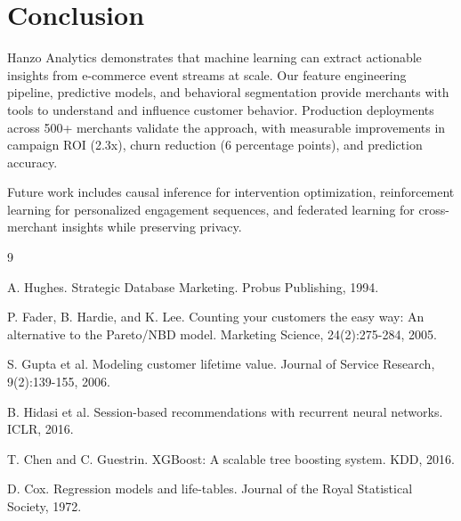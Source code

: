 \section{Conclusion}


Hanzo Analytics demonstrates that machine learning can extract actionable insights from e-commerce event streams at scale. Our feature engineering pipeline, predictive models, and behavioral segmentation provide merchants with tools to understand and influence customer behavior. Production deployments across 500+ merchants validate the approach, with measurable improvements in campaign ROI (2.3x), churn reduction (6 percentage points), and prediction accuracy.

Future work includes causal inference for intervention optimization, reinforcement learning for personalized engagement sequences, and federated learning for cross-merchant insights while preserving privacy.


\begin{thebibliography}{9}

A. Hughes. Strategic Database Marketing. Probus Publishing, 1994.

P. Fader, B. Hardie, and K. Lee. Counting your customers the easy way: An alternative to the Pareto/NBD model. Marketing Science, 24(2):275-284, 2005.

S. Gupta et al. Modeling customer lifetime value. Journal of Service Research, 9(2):139-155, 2006.

B. Hidasi et al. Session-based recommendations with recurrent neural networks. ICLR, 2016.

T. Chen and C. Guestrin. XGBoost: A scalable tree boosting system. KDD, 2016.

D. Cox. Regression models and life-tables. Journal of the Royal Statistical Society, 1972.

\end{thebibliography}

